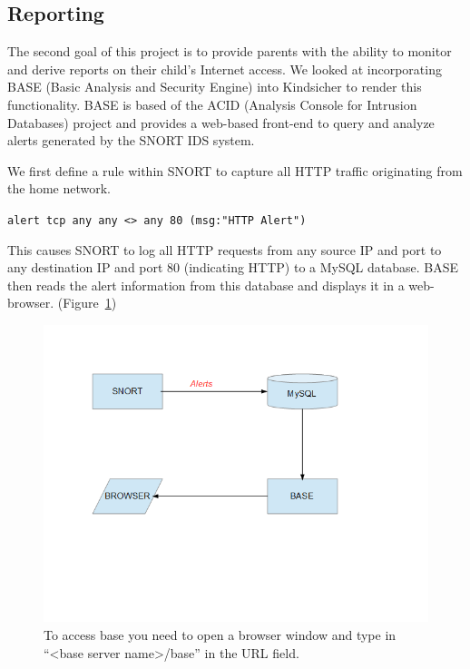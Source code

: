 \subsection{Reporting}

The second goal of this project is to provide parents with the ability to
monitor and derive reports on their child's Internet access.
%
We looked at incorporating BASE (Basic Analysis and Security Engine) into Kindsicher to
render this functionality.
%
BASE is based of the ACID (Analysis Console for Intrusion Databases) project
and provides a web-based front-end to query and analyze alerts generated by
the SNORT IDS system.

We first define a rule within SNORT to capture all HTTP traffic originating
from the home network.

\verb+alert tcp any any <> any 80 (msg:"HTTP Alert")+

This causes SNORT to log all HTTP requests from any source IP and port to any
destination IP and port 80 (indicating HTTP) to a MySQL database.
%
BASE then reads the alert information from this database and displays it in a
web-browser. (Figure~\ref{fig:r1})

\begin{figure}[!t]
    \centering
    \includegraphics[width=\columnwidth]{figures/R1_BASE_Flow}
    \caption{To access base you need to open a browser window and type in ``<base server
name>/base'' in the URL field.}
    \label{fig:r1}
\end{figure}

